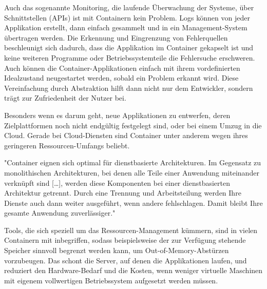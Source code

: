 Auch das sogenannte Monitoring, die laufende Überwachung der Systeme, über Schnittstellen (APIs) ist mit Containern kein Problem. Logs können von jeder Applikation erstellt, dann einfach gesammelt und in ein Management-System übertragen werden. Die Erkennung und Eingrenzung von Fehlerquellen beschleunigt sich dadurch, dass die Applikation im Container gekapselt ist und keine weiteren Programme oder Betriebssystemteile die Fehlersuche erschweren. Auch können die Container-Applikationen einfach mit ihrem vordefinierten Idealzustand neugestartet werden, sobald ein Problem erkannt wird.
Diese Vereinfachung durch Abstraktion hilft dann nicht nur dem Entwickler, sondern trägt zur Zufriedenheit der Nutzer bei. 

Besonders wenn es darum geht, neue Applikationen zu entwerfen, deren Zielplattformen noch nicht endgültig festgelegt sind, oder bei einem Umzug in die Cloud. Gerade bei Cloud-Diensten sind Container unter anderem wegen ihres geringeren Ressourcen-Umfangs beliebt.
\citep{12771285120180201}

"Container eignen sich optimal für dienstbasierte Architekturen. Im Gegensatz zu monolithischen Architekturen, bei denen alle Teile einer Anwendung miteinander verknüpft sind […], werden diese Komponenten bei einer dienstbasierten Architektur getrennt. Durch eine Trennung und Arbeitsteilung werden Ihre Dienste auch dann weiter ausgeführt, wenn andere fehlschlagen. Damit bleibt Ihre gesamte Anwendung zuverlässiger."\citep{GoogleContainers}

Tools, die sich speziell um das Ressourcen-Management kümmern, sind in vielen Containern mit inbegriffen, sodass beispielsweise der zur Verfügung stehende Speicher sinnvoll begrenzt werden kann, um Out-of-Memory-Abstürzen vorzubeugen. 
Das schont die Server, auf denen die Applikationen laufen, und reduziert den Hardware-Bedarf und die Kosten, wenn weniger virtuelle Maschinen mit eigenem vollwertigen Betriebssystem aufgesetzt werden müssen.
\citep{11517836120160501}
